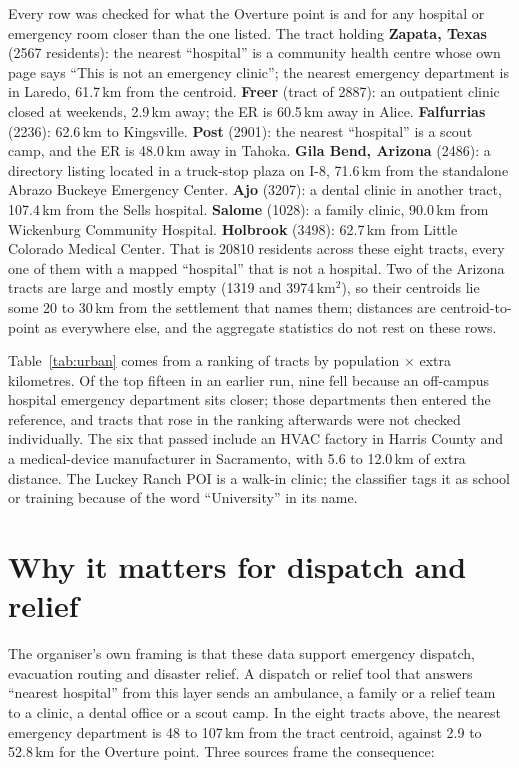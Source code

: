 \documentclass[a4paper]{article}
\begin{document}
Every row was checked for what the Overture point is and for any hospital or emergency room closer
than the one listed. The tract holding \textbf{Zapata, Texas} (\num{2567} residents): the nearest
``hospital'' is a community health centre whose own page says ``This is not an emergency clinic'';
the nearest emergency department is in Laredo, 61.7\,km from the centroid.
\textbf{Freer} (tract of \num{2887}): an outpatient clinic closed at weekends, 2.9\,km away; the
ER is 60.5\,km away in Alice. \textbf{Falfurrias} (\num{2236}): 62.6\,km to Kingsville.
\textbf{Post} (\num{2901}): the nearest ``hospital'' is a scout camp, and the ER is 48.0\,km away in
Tahoka.
\textbf{Gila Bend, Arizona} (\num{2486}): a directory listing located in a truck-stop plaza on I-8,
71.6\,km from the standalone Abrazo Buckeye Emergency Center. \textbf{Ajo} (\num{3207}): a dental
clinic in another tract, 107.4\,km from the Sells hospital. \textbf{Salome} (\num{1028}): a family
clinic, 90.0\,km from Wickenburg Community Hospital. \textbf{Holbrook} (\num{3498}): 62.7\,km from
Little Colorado Medical Center. That is \num{20810} residents across these eight tracts, every one
of them with a mapped ``hospital'' that is not a hospital. Two of the Arizona tracts are large and
mostly empty (\num{1319} and \num{3974}\,km$^2$), so their centroids lie some 20 to 30\,km from the
settlement that names them; distances are centroid-to-point as everywhere else, and the aggregate
statistics do not rest on these rows.

Table~\ref{tab:urban} comes from a ranking of tracts by population $\times$ extra kilometres. Of the top fifteen in
an earlier run, nine fell because an off-campus hospital emergency department sits closer; those departments
then entered the reference, and tracts that rose in the ranking afterwards were not checked individually. The
six that passed include an HVAC factory in Harris County and a medical-device manufacturer in Sacramento, with
5.6 to 12.0\,km of extra distance. The Luckey Ranch POI is a walk-in clinic; the classifier tags it as school
or training because of the word ``University'' in its name.

\section{Why it matters for dispatch and relief}

The organiser's own framing is that these data support emergency dispatch, evacuation routing
and disaster relief. A dispatch or relief tool that answers ``nearest hospital'' from this
layer sends an ambulance, a family or a relief team to a clinic, a dental office or a scout
camp. In the eight tracts above, the nearest emergency department is 48 to 107\,km from the
tract centroid, against 2.9 to 52.8\,km for the Overture point. Three sources frame the consequence:
\end{document}
